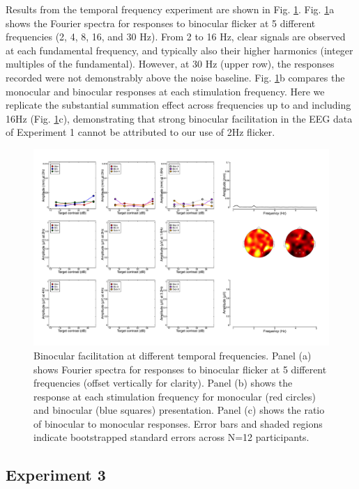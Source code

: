 \documentclass[
]{article}
\begin{document}
Results from the temporal frequency experiment are shown in Fig. \ref{fig:TFdata}. Fig. \ref{fig:TFdata}a shows the Fourier spectra for responses to binocular flicker at 5 different frequencies (2, 4, 8, 16, and 30 Hz). From 2 to 16 Hz, clear signals are observed at each fundamental frequency, and typically also their higher harmonics (integer multiples of the fundamental). However, at 30 Hz (upper row), the responses recorded were not demonstrably above the noise baseline. Fig. \ref{fig:TFdata}b compares the monocular and binocular responses at each stimulation frequency. Here we replicate the substantial summation effect across frequencies up to and including 16Hz (Fig. \ref{fig:TFdata}c), demonstrating that strong binocular facilitation in the EEG data of Experiment 1 cannot be attributed to our use of 2Hz flicker.

\begin{figure}

{\centering \includegraphics{Figures/blank} 

}

\caption{Binocular facilitation at different temporal frequencies. Panel (a) shows Fourier spectra for responses to binocular flicker at 5 different frequencies (offset vertically for clarity). Panel (b) shows the response at each stimulation frequency for monocular (red circles) and binocular (blue squares) presentation. Panel (c) shows the ratio of binocular to monocular responses. Error bars and shaded regions indicate bootstrapped standard errors across N=12 participants.}\label{fig:TFdata}
\end{figure}

\hypertarget{experiment-3}{%
\subsection{Experiment 3}\label{experiment-3}}
\end{document}

